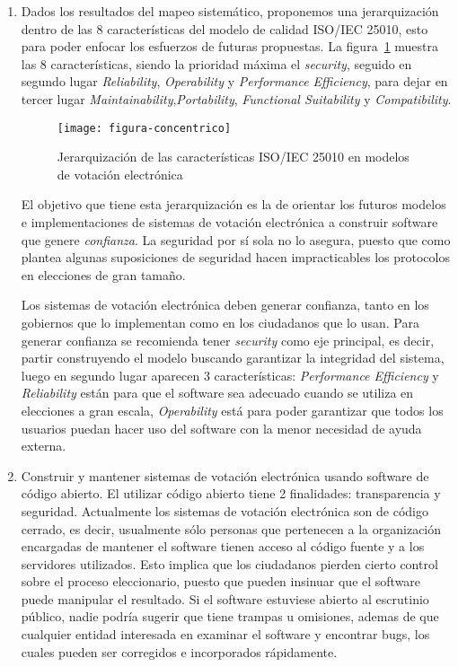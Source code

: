 \begin{enumerate}

	\item Dados los resultados del mapeo sistemático, proponemos una jerarquización dentro de las 8 
		características del modelo de calidad ISO/IEC 25010, esto para poder enfocar los esfuerzos
		de futuras propuestas. La figura~\ref{fig:concentrico} muestra las 8 características, siendo
		la prioridad máxima el \textit{security}, seguido en segundo lugar \textit{Reliability}, \textit{Operability}
		 y \textit{Performance Efficiency}, para dejar en tercer lugar \textit{Maintainability},\textit{Portability},
		\textit{Functional Suitability} y \textit{Compatibility}.

	\begin{figure}[h!]
		\centering
		\texttt{[image: figura-concentrico]}
		\caption{Jerarquización de las características ISO/IEC 25010 en modelos de votación electrónica}
		\label{fig:concentrico}
	\end{figure}
	\bigskip
		
		El objetivo que tiene esta jerarquización es la de orientar los futuros modelos e implementaciones
		de sistemas de votación electrónica a construir software que genere \textit{confianza}. La seguridad
		por sí sola no lo asegura, puesto que como plantea \cite{Spycher2012} algunas suposiciones de seguridad
		hacen impracticables los protocolos en elecciones de gran tamaño.
		
		Los sistemas de votación electrónica deben generar confianza, tanto en los gobiernos que lo implementan
		como en los ciudadanos que lo usan. Para generar confianza se recomienda 
		tener \textit{security} como eje principal, es decir, partir construyendo el modelo 
		buscando garantizar la integridad del sistema, luego en segundo lugar aparecen 3 características:		
		\textit{Performance Efficiency} y \textit{Reliability}  están para que el software sea adecuado cuando se utiliza en elecciones a gran escala, 
		\textit{Operability} está para poder garantizar que todos los usuarios puedan hacer uso del software 
		con la menor necesidad de ayuda externa.
	

	\item Construir y mantener sistemas de votación electrónica usando software de código abierto. El utilizar código
		abierto tiene 2 finalidades: transparencia y seguridad. Actualmente los sistemas de votación electrónica
		son de código cerrado, es decir, usualmente sólo personas que pertenecen a la organización encargadas 
		de mantener el software	tienen acceso al código fuente y a los servidores utilizados. Esto implica que los 
		ciudadanos pierden cierto control sobre el proceso eleccionario, puesto que pueden insinuar que el
		software puede manipular el resultado. Si el software estuviese abierto al escrutinio público, nadie podría
		sugerir que tiene trampas u omisiones, ademas de que cualquier entidad interesada
		en examinar el software y encontrar bugs, los cuales pueden ser corregidos e 
		incorporados rápidamente.
		

\end{enumerate}
